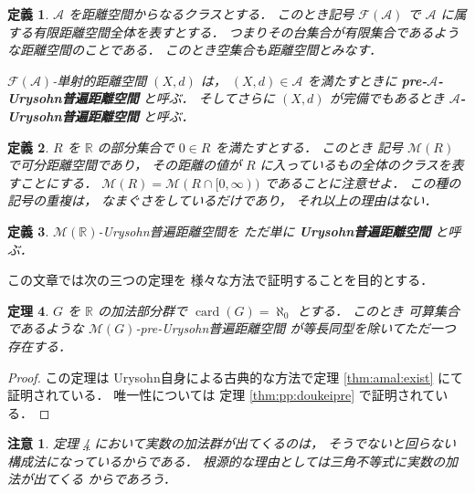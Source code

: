 \documentclass[leqno, 12pt]{jsarticle}
\newtheorem{thm}{定理}[section]
\newtheorem{df}[thm]{定義}
\newtheorem*{rmk}{注意}
\newcommand{\rr}{\mathbb{R}}
\DeclareMathOperator{\card}{card}
\newcommand{\Met}[1]{\mathscr{M}(#1)}
\newcommand{\FinitePart}[1]{\mathscr{F}(#1)}
\begin{document}
\begin{df}\label{df:intro:Urysohn}
$\mathscr{A}$
を距離空間からなるクラスとする．
このとき記号
$\FinitePart{\mathscr{A}}$
で
$\mathscr{A}$
に属する有限距離空間全体を表すとする．
つまりその台集合が有限集合であるような距離空間のことである．
このとき空集合も距離空間とみなす．

$\FinitePart{\mathscr{A}}$-単射的距離空間
$(X, d)$
は，
$(X, d)\in \mathscr{A}$
を満たすときに
\textbf{pre-$\mathscr{A}$-Urysohn普遍距離空間}
と呼ぶ．
そしてさらに
$(X, d)$
が完備でもあるとき
\textbf{%
$\mathscr{A}$-Urysohn普遍距離空間}
と呼ぶ．
\end{df}



\begin{df}\label{df:intro:cat}
$R$
を
$\rr$
の部分集合で
$0\in R$
を満たすとする．
このとき
記号
$\Met{R}$
で可分距離空間であり，
その距離の値が
$R$
に入っているもの全体のクラスを表すことにする．
$\Met{R}=\Met{R\cap[0,\infty)}$
であることに注意せよ．
この種の記号の重複は，%
なまぐさをしているだけであり，
それ以上の理由はない．
\end{df}




\begin{df}\label{df:intro:originalUrysohn}
$\Met{\rr}$-Urysohn普遍距離空間を
ただ単に
\textbf{Urysohn普遍距離空間}
と呼ぶ．
\end{df}


この文章では次の三つの定理を
様々な方法で証明することを目的とする．



\begin{thm}\label{thm:intro:existpre}
$G$
を
$\rr$%
の加法部分群で
$\card(G)=\aleph_0$
とする．
このとき
可算集合であるような
$\Met{G}$-pre-Urysohn普遍距離空間
が等長同型を除いてただ一つ存在する．
\end{thm}
\begin{proof}
この定理は
Urysohn自身による古典的な方法で定理
\ref{thm:amal:exist}
にて証明されている．
唯一性については
定理 \ref{thm:pp:doukeipre}
で証明されている．
\end{proof}



\begin{rmk}\label{rmk:intro:additive-group-role}
定理 \ref{thm:intro:existpre}
において実数の加法群が出てくるのは，
そうでないと回らない構成法になっているからである．
根源的な理由としては三角不等式に実数の加法が出てくる
からであろう．
\end{rmk}
\end{document}
